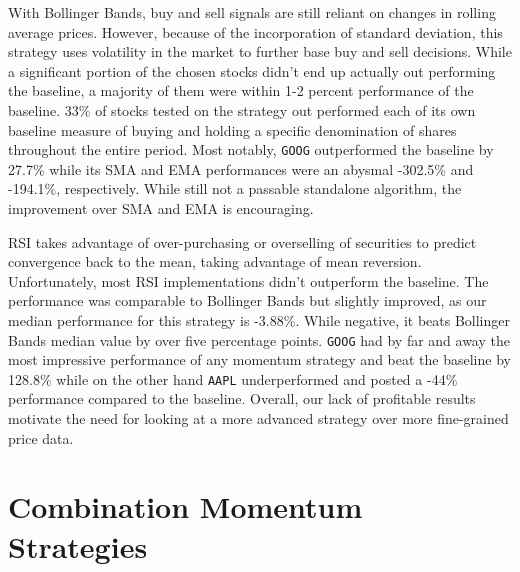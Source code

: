 \documentclass[../thesis.tex]{subfiles}
\begin{document}
With Bollinger Bands, buy and sell signals are still reliant on changes in rolling average prices. However, because of the incorporation of standard deviation, this strategy uses volatility in the market to further base buy and sell decisions. While a significant portion of the chosen stocks didn't end up actually out performing the baseline, a majority of them were within 1-2 percent performance of the baseline. 33\% of stocks tested on the strategy out performed each of its own baseline measure of buying and holding a specific denomination of shares throughout the entire period. Most notably, \texttt{GOOG} outperformed the baseline by 27.7\% while its SMA and EMA performances were an abysmal -302.5\% and -194.1\%, respectively. While still not a passable standalone algorithm, the improvement over SMA and EMA is encouraging.

RSI takes advantage of over-purchasing or overselling of securities to predict convergence back to the mean, taking advantage of mean reversion. Unfortunately, most RSI implementations didn't outperform the baseline. The performance was comparable to Bollinger Bands but slightly improved, as our median performance for this strategy is -3.88\%. While negative, it beats Bollinger Bands median value by over five percentage points. \texttt{GOOG} had by far and away the most impressive performance of any momentum strategy and beat the baseline by 128.8\% while on the other hand \texttt{AAPL} underperformed and posted a -44\% performance compared to the baseline. Overall, our lack of profitable results motivate the need for looking at a more advanced strategy over more fine-grained price data.



\section{Combination Momentum Strategies}
\end{document}
